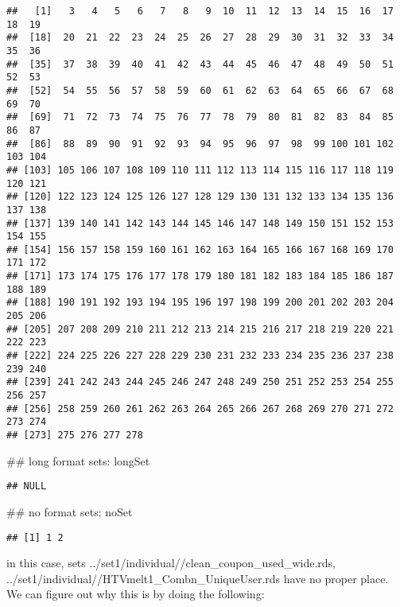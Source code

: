 \documentclass[10pt]{report}
\newenvironment{Shaded}{}{}
\newcommand{\NormalTok}[1]{{#1}}
\begin{document}
\begin{verbatim}
##   [1]   3   4   5   6   7   8   9  10  11  12  13  14  15  16  17  18  19
##  [18]  20  21  22  23  24  25  26  27  28  29  30  31  32  33  34  35  36
##  [35]  37  38  39  40  41  42  43  44  45  46  47  48  49  50  51  52  53
##  [52]  54  55  56  57  58  59  60  61  62  63  64  65  66  67  68  69  70
##  [69]  71  72  73  74  75  76  77  78  79  80  81  82  83  84  85  86  87
##  [86]  88  89  90  91  92  93  94  95  96  97  98  99 100 101 102 103 104
## [103] 105 106 107 108 109 110 111 112 113 114 115 116 117 118 119 120 121
## [120] 122 123 124 125 126 127 128 129 130 131 132 133 134 135 136 137 138
## [137] 139 140 141 142 143 144 145 146 147 148 149 150 151 152 153 154 155
## [154] 156 157 158 159 160 161 162 163 164 165 166 167 168 169 170 171 172
## [171] 173 174 175 176 177 178 179 180 181 182 183 184 185 186 187 188 189
## [188] 190 191 192 193 194 195 196 197 198 199 200 201 202 203 204 205 206
## [205] 207 208 209 210 211 212 213 214 215 216 217 218 219 220 221 222 223
## [222] 224 225 226 227 228 229 230 231 232 233 234 235 236 237 238 239 240
## [239] 241 242 243 244 245 246 247 248 249 250 251 252 253 254 255 256 257
## [256] 258 259 260 261 262 263 264 265 266 267 268 269 270 271 272 273 274
## [273] 275 276 277 278
\end{verbatim}

\begin{Shaded}
\begin{Highlighting}[]
\NormalTok{## long format sets:}
\NormalTok{longSet}
\end{Highlighting}
\end{Shaded}

\begin{verbatim}
## NULL
\end{verbatim}

\begin{Shaded}
\begin{Highlighting}[]
\NormalTok{## no format sets:}
\NormalTok{noSet}
\end{Highlighting}
\end{Shaded}

\begin{verbatim}
## [1] 1 2
\end{verbatim}

in this case, sets ../set1/individual//clean\_coupon\_used\_wide.rds,
../set1/individual//HTVmelt1\_Combn\_UniqueUser.rds have no proper
place. We can figure out why this is by doing the following:
\end{document}
